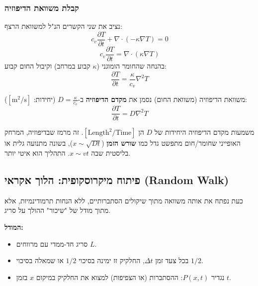 \subsubsection{קבלת משוואת הדיפוזיה}
נציב את שני הקשרים הנ"ל למשוואת הרצף:
\[
c_v \frac{\partial T}{\partial t} + \nabla \cdot (-\kappa \nabla T) = 0
\]
\[
c_v \frac{\partial T}{\partial t} = \nabla \cdot (\kappa \nabla T)
\]
בהנחה שהחומר הומוגני ($\kappa$ קבוע במרחב) וקיבול החום קבוע:
\[
\frac{\partial T}{\partial t} = \frac{\kappa}{c_v} \nabla^2 T
\]

\begin{resultbox}{משוואת הדיפוזיה (משוואת החום)}
נסמן את \textbf{מקדם הדיפוזיה} ב-$D = \frac{\kappa}{c_v}$ (יחידות: $[\text{m}^2/\text{s}]$):
\[
\boxed{\frac{\partial T}{\partial t} = D \nabla^2 T}
\]
\end{resultbox}

\begin{notebox}{משמעות מקדם הדיפוזיה}
היחידות של $D$ הן $[\text{Length}^2 / \text{Time}]$. זה מרמז שבדיפוזיה, המרחק האופייני שחומר/חום מתפשט גדל כמו \textbf{שורש הזמן} ($x \sim \sqrt{Dt}$), בשונה מתנועה גלית או בליסטית שבה $x \sim vt$. התהליך הוא איטי יותר.
\end{notebox}

\subsection{פיתוח מיקרוסקופית: הלוך אקראי (Random Walk)}

כעת נפתח את אותה משוואה מתוך שיקולים הסתברותיים, ללא הנחות תרמודינמיות, אלא מתוך מודל של "שיכור" ההולך על סריג.

\textbf{המודל:}
\begin{itemize}
    \item סריג חד-ממדי עם מרווחים $L$.
    \item בכל צעד זמן $\Delta t$, החלקיק זז ימינה בסיכוי $1/2$ או שמאלה בסיכוי $1/2$.
    \item נגדיר $P(x,t)$: ההסתברות (או הצפיפות) למצוא את החלקיק במיקום $x$ בזמן $t$.
\end{itemize}

\begin{center}
\end{center}

